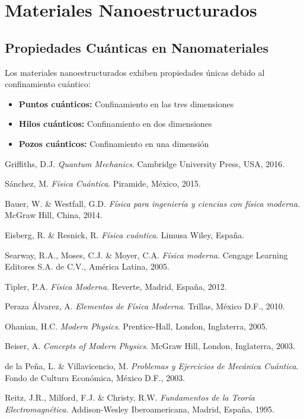 \documentclass[12pt,a4paper,twoside]{book}
\begin{document}
	\chapter{Materiales Nanoestructurados}
	
	\section{Propiedades Cuánticas en Nanomateriales}
	
	Los materiales nanoestructurados exhiben propiedades únicas debido al confinamiento cuántico:
	
	\begin{itemize}
		\item \textbf{Puntos cuánticos:} Confinamiento en las tres dimensiones
		\item \textbf{Hilos cuánticos:} Confinamiento en dos dimensiones
		\item \textbf{Pozos cuánticos:} Confinamiento en una dimensión
	\end{itemize}
	
	\backmatter
	\begin{thebibliography}{99}
		 Griffiths, D.J. \textit{Quantum Mechanics}. Cambridge University Press, USA, 2016.
		
		 Sánchez, M. \textit{Física Cuántica}. Piramide, México, 2015.
		
		 Bauer, W. \& Westfall, G.D. \textit{Física para ingeniería y ciencias con física moderna}. McGraw Hill, China, 2014.
		
		 Eisberg, R. \& Resnick, R. \textit{Física cuántica}. Limusa Wiley, España.
		
		 Searway, R.A., Moses, C.J. \& Moyer, C.A. \textit{Física moderna}. Cengage Learning Editores S.A. de C.V., América Latina, 2005.
		
		 Tipler, P.A. \textit{Física Moderna}. Reverte, Madrid, España, 2012.
		
		 Peraza Álvarez, A. \textit{Elementos de Física Moderna}. Trillas, México D.F., 2010.
		
		 Ohanian, H.C. \textit{Modern Physics}. Prentice-Hall, London, Inglaterra, 2005.
		
		 Beiser, A. \textit{Concepts of Modern Physics}. McGraw Hill, London, Inglaterra, 2003.
		
		 de la Peña, L. \& Villavicencio, M. \textit{Problemas y Ejercicios de Mecánica Cuántica}. Fondo de Cultura Económica, México D.F., 2003.
		
		 Reitz, J.R., Milford, F.J. \& Christy, R.W. \textit{Fundamentos de la Teoría Electromagnética}. Addison-Wesley Iberoamericana, Madrid, España, 1995.
	\end{thebibliography}
	
\end{document}

